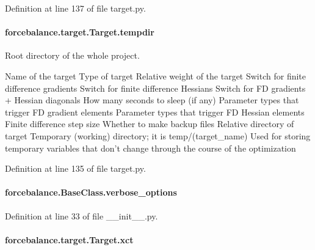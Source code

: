 Definition at line 137 of file target.\-py.

\hypertarget{classforcebalance_1_1target_1_1Target_aa1f01b5b78db253b5b66384ed11ed193}{
\paragraph[{tempdir}]{\setlength{\rightskip}{0pt plus 5cm}forcebalance.\-target.\-Target.\-tempdir\hspace{0.3cm}{\ttfamily [inherited]}}}\label{classforcebalance_1_1target_1_1Target_aa1f01b5b78db253b5b66384ed11ed193}


Root directory of the whole project. 

Name of the target Type of target Relative weight of the target Switch for finite difference gradients Switch for finite difference Hessians Switch for F\-D gradients + Hessian diagonals How many seconds to sleep (if any) Parameter types that trigger F\-D gradient elements Parameter types that trigger F\-D Hessian elements Finite difference step size Whether to make backup files Relative directory of target Temporary (working) directory; it is temp/(target\-\_\-name) Used for storing temporary variables that don't change through the course of the optimization 

Definition at line 135 of file target.\-py.

\hypertarget{classforcebalance_1_1BaseClass_afd68efa29ccd2f320f4cf82198214aac}{
\paragraph[{verbose\-\_\-options}]{\setlength{\rightskip}{0pt plus 5cm}forcebalance.\-Base\-Class.\-verbose\-\_\-options\hspace{0.3cm}{\ttfamily [inherited]}}}\label{classforcebalance_1_1BaseClass_afd68efa29ccd2f320f4cf82198214aac}


Definition at line 33 of file \-\_\-\-\_\-init\-\_\-\-\_\-.\-py.

\hypertarget{classforcebalance_1_1target_1_1Target_aad2e385cfbf7b4a68f1c2cb41133fe82}{
\paragraph[{xct}]{\setlength{\rightskip}{0pt plus 5cm}forcebalance.\-target.\-Target.\-xct\hspace{0.3cm}{\ttfamily [inherited]}}}\label{classforcebalance_1_1target_1_1Target_aad2e385cfbf7b4a68f1c2cb41133fe82}


